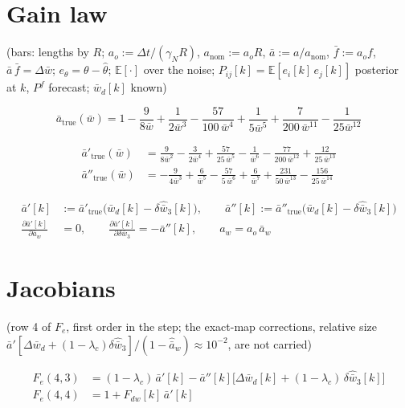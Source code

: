 \documentclass[11pt,a4paper,fontset=none]{ctexart}
\newcommand{\ba}{\bar{a}}
\newcommand{\bw}{\bar{w}}
\newcommand{\E}{\mathbb{E}}
\begin{document}
\section{Gain law}

(bars: lengths by $R$; $a_o := \Delta t/(\gamma_N R)$, $a_{\mathrm{nom}} := a_o R$,
$\ba := a/a_{\mathrm{nom}}$, $\bar{f} := a_o f$, $\ba\,\bar{f} = \Delta\bw$;
$e_{\theta} = \theta - \hat{\theta}$; $\E[\cdot]$ over the noise;
$P_{ij}[k] = \E[e_i[k]\,e_j[k]]$ posterior at $k$, $P^f$ forecast; $\bw_d[k]$ known)

\begin{equation*}
\ba_{\mathrm{true}}(\bw) = 1 - \frac{9}{8\bw} + \frac{1}{2\bw^{3}}
  - \frac{57}{100\,\bw^{4}} + \frac{1}{5\bw^{5}}
  + \frac{7}{200\,\bw^{11}} - \frac{1}{25\bw^{12}}
\end{equation*}

\begin{align*}
\ba'_{\mathrm{true}}(\bw)  &= \frac{9}{8\bw^{2}} - \frac{3}{2\bw^{4}}
  + \frac{57}{25\,\bw^{5}} - \frac{1}{\bw^{6}}
  - \frac{77}{200\,\bw^{12}} + \frac{12}{25\,\bw^{13}} \\
\ba''_{\mathrm{true}}(\bw) &= -\frac{9}{4\bw^{3}} + \frac{6}{\bw^{5}}
  - \frac{57}{5\,\bw^{6}} + \frac{6}{\bw^{7}}
  + \frac{231}{50\,\bw^{13}} - \frac{156}{25\,\bw^{14}}
\end{align*}

\begin{align*}
\ba'[k]  &:= \ba'_{\mathrm{true}}\bigl(\bw_d[k] - \delta\hat{\bw}_3[k]\bigr) , \qquad
\ba''[k] := \ba''_{\mathrm{true}}\bigl(\bw_d[k] - \delta\hat{\bw}_3[k]\bigr) \\
\frac{\partial \ba'[k]}{\partial \ba_w} &= 0 , \qquad
\frac{\partial \ba'[k]}{\partial \delta\bw_3} = -\ba''[k] , \qquad
a_w = a_o\,\ba_w
\end{align*}

\section{Jacobians}

(row 4 of $F_e$, first order in the step; the exact-map corrections, relative size
$\ba'[\Delta\bw_d + (1-\lambda_c)\delta\hat{\bw}_3]/(1-\hat{\ba}_w) \approx 10^{-2}$, are not carried)

\begin{align*}
F_e(4,3) &= (1-\lambda_c)\,\ba'[k] - \ba''[k]\bigl[\Delta\bw_d[k] + (1-\lambda_c)\,\delta\hat{\bw}_3[k]\bigr] \\
F_e(4,4) &= 1 + F_{dw}[k]\,\ba'[k]
\end{align*}
\end{document}
